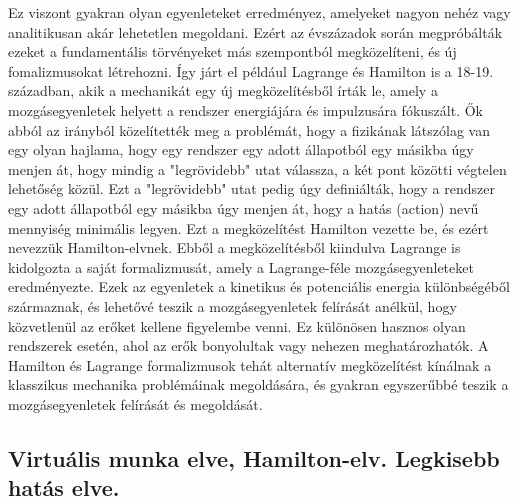 \documentclass[a4paper,12pt]{article}
\begin{document}
Ez viszont gyakran olyan egyenleteket erredményez, amelyeket nagyon nehéz vagy analitikusan akár lehetetlen megoldani. Ezért az évszázadok során megpróbálták ezeket a fundamentális törvényeket más szempontból megközelíteni,
és új fomalizmusokat létrehozni. Így járt el például Lagrange és Hamilton is a 18-19. században, akik a mechanikát egy új megközelítésből írták le, amely a mozgásegyenletek helyett a rendszer energiájára és impulzusára fókuszált.
Ők abból az irányból közelítették meg a problémát, hogy a fizikának látszólag van egy olyan hajlama, hogy egy rendszer egy adott állapotból egy másikba úgy menjen át, hogy mindig a "legrövidebb" utat válassza, a két pont közötti
végtelen lehetőség közül. Ezt a "legrövidebb" utat pedig úgy definiálták, hogy a rendszer egy adott állapotból egy másikba úgy menjen át, hogy a hatás (action) nevű mennyiség minimális legyen. Ezt a megközelítést Hamilton vezette be, és ezért nevezzük Hamilton-elvnek.
Ebből a megközelítésből kiindulva Lagrange is kidolgozta a saját formalizmusát, amely a Lagrange-féle mozgásegyenleteket eredményezte. Ezek az egyenletek a kinetikus és potenciális energia különbségéből származnak, és lehetővé teszik a
mozgásegyenletek felírását anélkül, hogy közvetlenül az erőket kellene figyelembe venni. Ez különösen hasznos olyan rendszerek esetén, ahol az erők bonyolultak vagy nehezen meghatározhatók.
A Hamilton és Lagrange formalizmusok tehát alternatív megközelítést kínálnak a klasszikus mechanika problémáinak megoldására, és gyakran egyszerűbbé teszik a mozgásegyenletek felírását és megoldását.

\subsection{Virtuális munka elve, Hamilton-elv. Legkisebb hatás elve.}
\end{document}

